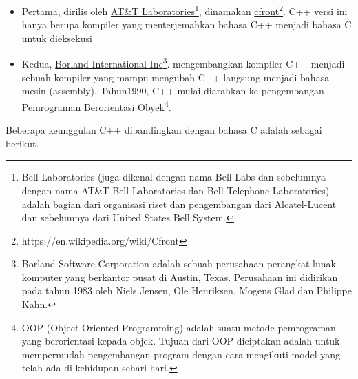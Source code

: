\begin{itemize}

\item
  Pertama, dirilis oleh
  \href{https://id.wikipedia.org/wiki/Bell_Laboratories}{AT\&T
  Laboratories}\footnote{Bell Laboratories (juga dikenal dengan nama Bell Labs dan sebelumnya dengan nama AT\&T Bell Laboratories dan Bell Telephone Laboratories) adalah bagian dari organisasi riset dan pengembangan dari Alcatel-Lucent dan sebelumnya dari United States Bell System.}, dinamakan
  \href{https://en.wikipedia.org/wiki/Cfront}{cfront}\footnote{https://en.wikipedia.org/wiki/Cfront}. C++ versi ini
  hanya berupa kompiler yang menterjemahkan bahasa C++ menjadi bahasa C
  untuk dieksekusi
\item
  Kedua, \href{https://en.wikipedia.org/wiki/Borland}{Borland
  International Inc}\footnote{Borland Software Corporation adalah sebuah perusahaan perangkat lunak komputer yang berkantor pusat di Austin, Texas. Perusahaan ini didirikan pada tahun 1983 oleh Niels Jensen, Ole Henriksen, Mogens Glad dan Philippe Kahn.}. mengembangkan kompiler C++ menjadi sebuah kompiler
  yang mampu mengubah C++ langsung menjadi bahasa mesin (assembly).
  Tahun1990, C++ mulai diarahkan ke pengembangan
  \href{https://id.wikipedia.org/wiki/Pemrograman_berorientasi_objek}{Pemrograman
  Berorientasi Obyek}\footnote{OOP (Object Oriented Programming) adalah suatu metode pemrograman yang berorientasi kepada objek. Tujuan dari OOP diciptakan adalah untuk mempermudah pengembangan program dengan cara mengikuti model yang telah ada di kehidupan sehari-hari.}.
\end{itemize}

Beberapa keunggulan C++ dibandingkan dengan bahasa C adalah sebagai
berikut.

